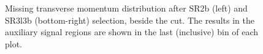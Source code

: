 \begin{figure}[h!]
\centering
{}
\caption{Missing transverse momentum distribution after SR2b (left) and SR3l3b (bottom-right) selection, beside the \met cut. The results in the auxiliary signal regions are shown in the last (inclusive) bin of each plot.}
\label{fig:Results_auxSR_metD} 
\end{figure}

\FloatBarrier

